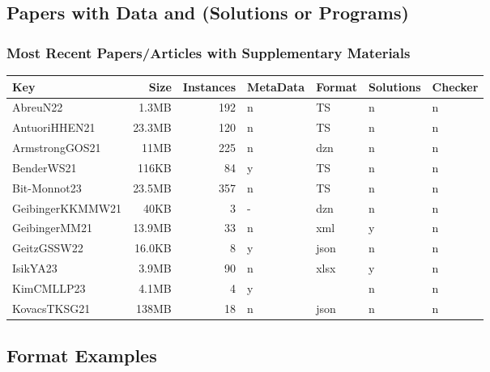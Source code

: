 \documentclass[dvipsnames,aspectratio=169]{beamer}
\newcommand{\su}[1]{\Shortunderstack[l]{#1}}
\begin{document}
\subsection{Papers with Data and (Solutions or Programs)}

\begin{frame}
\frametitle{Most Recent Papers/Articles with Supplementary Materials}

{\scriptsize
\begin{tabular}{lrrllll} \toprule
Key & Size & Instances & MetaData & Format & Solutions & Checker \\ \midrule
AbreuN22 \cite{AbreuN22} & 1.3MB & 192 & n & TS & n & n\\
AntuoriHHEN21 \cite{AntuoriHHEN21}& 23.3MB& 120 & n & TS & n & n\\
ArmstrongGOS21 \cite{ArmstrongGOS21}& 11MB & 225 & n & dzn & n & n\\
BenderWS21 \cite{BenderWS21}& 116KB& 84 & y & TS & n & n\\
Bit-Monnot23 \cite{Bit-Monnot23}& 23.5MB & 357 & n & TS & n & n\\
GeibingerKKMMW21 \cite{GeibingerKKMMW21}& 40KB& 3 & - & dzn & n & n\\
GeibingerMM21 \cite{GeibingerMM21}& 13.9MB & 33 & n & xml & y& n\\
GeitzGSSW22 \cite{GeitzGSSW22}& 16.0KB & 8 & y & json & n & n\\
IsikYA23 \cite{IsikYA23} & 3.9MB & 90 & n & xlsx & y & n\\
KimCMLLP23 \cite{KimCMLLP23}& 4.1MB & 4 & y & \su{csv json} & n& n\\
KovacsTKSG21 \cite{KovacsTKSG21}& 138MB & 18 & n & json & n & n\\
\bottomrule
\end{tabular}
}

\end{frame}


\subsection{Format Examples}
\end{document}
